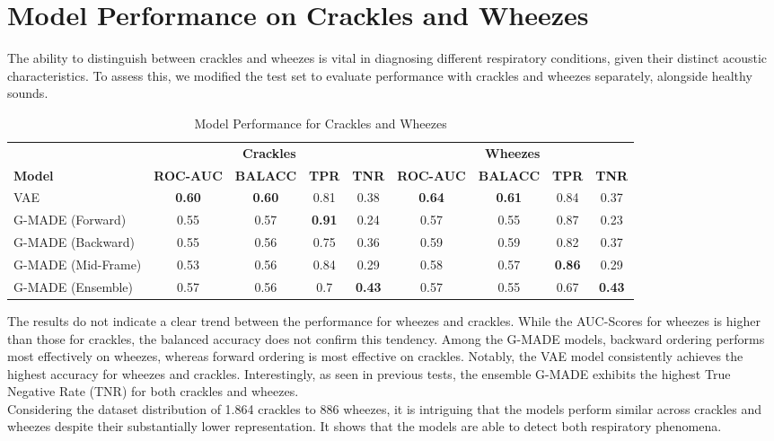 \section{Model Performance on Crackles and Wheezes}
The ability to distinguish between crackles and wheezes is vital in diagnosing different respiratory conditions, given their distinct acoustic characteristics. To assess this, we modified the test set to evaluate performance with crackles and wheezes separately, alongside healthy sounds.

\begin{table}[h!]
    \centering
    \caption{Model Performance for Crackles and Wheezes}
    \begin{tabular}{|l|c|c|c|c||c|c|c|c|}
    \hline
    & \multicolumn{4}{c||}{\textbf{Crackles}} & \multicolumn{4}{c|}{\textbf{Wheezes}} \\
    \cline{2-9}
    \textbf{Model} & \textbf{ROC-AUC} & \textbf{BALACC} & \textbf{TPR} & \textbf{TNR} & \textbf{ROC-AUC} & \textbf{BALACC} & \textbf{TPR} & \textbf{TNR} \\
    \hline
    VAE & \textbf{0.60} & \textbf{0.60} & 0.81 & 0.38 & \textbf{0.64} & \textbf{0.61} & 0.84 & 0.37 \\
    G-MADE (Forward) & 0.55 & 0.57 & \textbf{0.91} & 0.24 & 0.57 & 0.55 & 0.87 & 0.23 \\
    G-MADE (Backward) & 0.55 & 0.56 & 0.75 & 0.36 & 0.59 & 0.59 & 0.82 & 0.37 \\
    G-MADE (Mid-Frame) & 0.53 & 0.56 & 0.84 & 0.29 & 0.58 & 0.57 & \textbf{0.86} & 0.29 \\
    G-MADE (Ensemble) & 0.57 & 0.56 & 0.7 & \textbf{0.43} & 0.57 & 0.55 & 0.67 & \textbf{0.43} \\
    \hline
    \end{tabular}
\end{table}

The results do not indicate a clear trend between the performance for wheezes and crackles. While the AUC-Scores for wheezes is higher than those for crackles, the balanced accuracy does not confirm this tendency. Among the G-MADE models, backward ordering performs most effectively on wheezes, whereas forward ordering is most effective on crackles. Notably, the VAE model consistently achieves the highest accuracy for wheezes and crackles. Interestingly, as seen in previous tests, the ensemble G-MADE exhibits the highest True Negative Rate (TNR) for both crackles and wheezes.\\
Considering the dataset distribution of 1.864 crackles to 886 wheezes, it is intriguing that the models perform similar across crackles and wheezes despite their substantially lower representation. It shows that the models are able to detect both respiratory phenomena.

